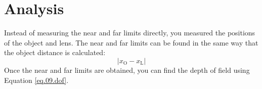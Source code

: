 \section{Analysis}
%
Instead of measuring the near and far limits directly, you measured the positions of the object and lens. The near and far limits can be found in the same way that the object distance is calculated:
\begin{equation}
    \vert x_{\text{O}} - x_{\text{L}} \vert
\end{equation}
Once the near and far limits are obtained, you can find the depth of field using Equation \ref{eq.09.dof}.
%
%
\newpage
